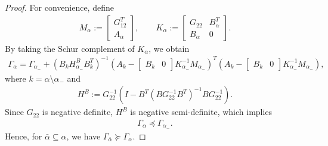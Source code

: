 \documentclass{article}
\begin{document}
	\begin{proof}
		For convenience, define
		\begin{align*}
			M_{\alpha} := 
			\begin{bmatrix}
				G_{12}^{T}\\
				A_{\alpha}
			\end{bmatrix},
			\qquad
			K_{\alpha} :=
			\begin{bmatrix}
				G_{22} & B_{\alpha}^{T}\\
				B_{\alpha} & 0
			\end{bmatrix}.
		\end{align*}
		By taking the Schur complement of $K_{\alpha}$, we obtain
		\begin{align*}
			\Gamma_{\alpha}
			= \Gamma_{\alpha_{-}}
			+ (B_{k}H_{\alpha_{-}}^{B}B_{k}^{T})^{-1}
			\left(A_{k}
			- \begin{bmatrix}
				B_{k} & 0
			\end{bmatrix}K_{\alpha_{-}}^{-1}M_{\alpha_{-}}\right)^{T}
			\left(A_{k}
			- \begin{bmatrix}
				B_{k} & 0
			\end{bmatrix}K_{\alpha_{-}}^{-1}M_{\alpha_{-}}\right),
		\end{align*}
		where $k = \alpha \setminus \alpha_{-}$ and
		\begin{align*}
		H^{B} := G_{22}^{-1}\left(I - B^{T}(BG_{22}^{-1}B^{T})^{-1}BG_{22}^{-1}\right).
		\end{align*}
		Since $G_{22}$ is negative definite, $H^{B}$ is negative semi-definite, which implies
		\begin{align*}
			\Gamma_{\alpha} \preccurlyeq \Gamma_{\alpha_{-}}.
		\end{align*}
		Hence, for $\bar{\alpha} \subseteq \alpha$, we have $\Gamma_{\bar{\alpha}} \succeq \Gamma_{\alpha}$.
		

\end{proof}
\end{document}
